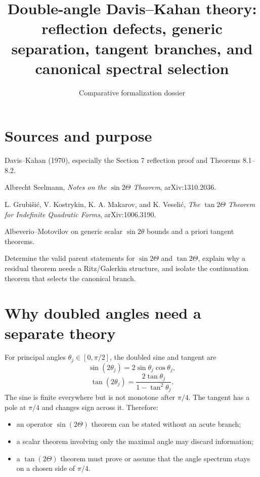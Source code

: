 
\title{Double-angle Davis--Kahan theory:\\reflection defects, generic separation, tangent branches, and canonical spectral selection}
\author{}
\date{Comparative formalization dossier}

\maketitle

\section*{Sources and purpose}
\begin{sourceguide}
\item[Primary source] Davis--Kahan (1970), especially the Section 7 reflection proof and Theorems 8.1--8.2.
\item[Generic separation] Albrecht Seelmann, \emph{Notes on the $\sin 2\Theta$ Theorem}, arXiv:1310.2036.
\item[Off-diagonal tangent] L. Grubi\v{s}i\'c, V. Kostrykin, K. A. Makarov, and K. Veseli\'c, \emph{The $\tan 2\Theta$ Theorem for Indefinite Quadratic Forms}, arXiv:1006.3190.
\item[Companion literature] Albeverio--Motovilov on generic scalar $\sin 2\theta$ bounds and a priori tangent theorems.
\item[Purpose] Determine the valid parent statements for $\sin 2\Theta$ and $\tan 2\Theta$, explain why a residual theorem needs a Ritz/Galerkin structure, and isolate the continuation theorem that selects the canonical branch.
\end{sourceguide}

\section{Why doubled angles need a separate theory}

For principal angles $\theta_j\in[0,\pi/2]$, the doubled sine and tangent are
\[
  \sin(2\theta_j)=2\sin\theta_j\cos\theta_j,
\]
\[
  \tan(2\theta_j)=\frac{2\tan\theta_j}{1-\tan^2\theta_j}.
\]
The sine is finite everywhere but is not monotone after $\pi/4$. The tangent has a pole at $\pi/4$ and changes sign across it. Therefore:
\begin{itemize}
\item an operator $\sin(2\Theta)$ theorem can be stated without an acute branch;
\item a scalar theorem involving only the maximal angle may discard information;
\item a $\tan(2\Theta)$ theorem must prove or assume that the angle spectrum stays on a chosen side of $\pi/4$.
\end{itemize}

